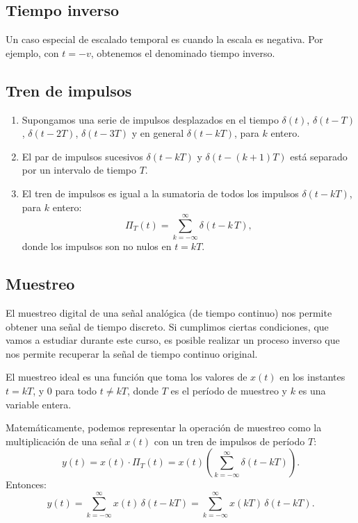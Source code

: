 \subsection{Tiempo inverso}

Un caso especial de escalado temporal es cuando la escala es
negativa. Por ejemplo, con $t = -v$, obtenemos el denominado tiempo inverso.

\subsection{Tren de impulsos}

\begin{enumerate}
	\item Supongamos una serie de impulsos desplazados en el tiempo $\delta(t)$,
	$\delta(t - T)$, $\delta(t - 2T)$, $\delta(t - 3T)$ y en
	general $\delta(t - kT)$, para $k$ entero.
	
	\item El par de impulsos sucesivos $\delta(t - kT)$ y $\delta(t - (k+1)T)$ está separado por un intervalo de tiempo $T$.
	
	\item El tren de impulsos es igual a la sumatoria de todos los
	impulsos $\delta(t - kT)$, para $k$ entero:
	\begin{equation}
		\Pi_{T}(t) = \sum_{k=-\infty}^{\infty} \delta(t - k \, T),
	\end{equation}
	donde los impulsos son no nulos en $t = kT$.
\end{enumerate}

\subsection{Muestreo}

El muestreo digital de una señal analógica (de tiempo continuo) nos permite obtener una señal de tiempo discreto. Si cumplimos ciertas condiciones, que vamos a estudiar durante este curso, 
es posible realizar un proceso inverso que nos permite recuperar la señal de tiempo continuo original.

El muestreo ideal es una función que toma los valores de $x(t)$ en los instantes $t = kT$, y $0$ para todo $t \neq kT$, 
donde $T$ es el período de muestreo y $k$ es una variable entera.

Matemáticamente, podemos representar la operación de muestreo como 
la multiplicación de una señal $x(t)$ con un tren de impulsos de período $T$:
\begin{equation}
	y(t) = x(t) \cdot \Pi_{T}(t) = x(t) \left( \sum_{k=-\infty}^{\infty} \delta(t - kT) \right).
\end{equation}
Entonces:
\begin{equation}
	y(t) = \sum_{k=-\infty}^{\infty} x(t) \, \delta(t - kT) = \sum_{k=-\infty}^{\infty} x(kT) \, \delta(t - kT).
\end{equation}


